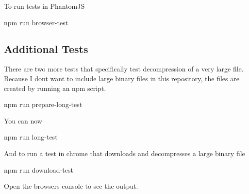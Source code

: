 To run tests in Phantom\+JS \begin{DoxyVerb}npm run browser-test
\end{DoxyVerb}


\subsection*{Additional Tests }

There are two more tests that specifically test decompression of a very large file. Because I don\textquotesingle{}t want to include large binary files in this repository, the files are created by running an npm script. \begin{DoxyVerb}npm run prepare-long-test
\end{DoxyVerb}


You can now \begin{DoxyVerb}npm run long-test
\end{DoxyVerb}


And to run a test in chrome that downloads and decompresses a large binary file \begin{DoxyVerb}npm run download-test
\end{DoxyVerb}


Open the browser\textquotesingle{}s console to see the output. 